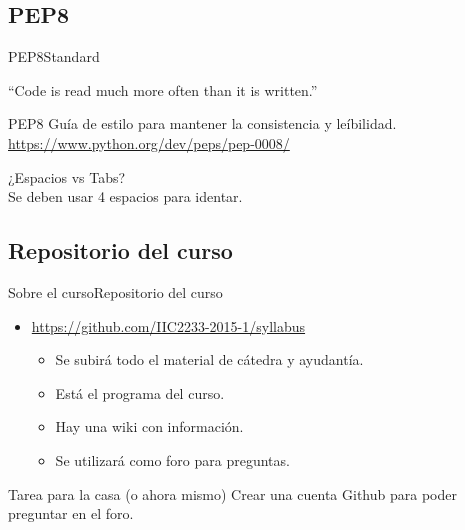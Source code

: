 \documentclass[spanish]{beamer}
\begin{document}
\subsection{PEP8}
\begin{frame}{PEP8}{Standard}

    \begin{exampleblock}{}
      {\large ``Code is read much more often than it is written.''}
      \vskip5mm
      \hspace*{}
    \end{exampleblock}
    
    \pause
    \begin{block}{PEP8}
        Guía de estilo para mantener la consistencia y leíbilidad. \\
        \url{https://www.python.org/dev/peps/pep-0008/}
    \end{block}
    
    \begin{example}
    ¿Espacios vs Tabs? \\
    Se deben usar 4 espacios para identar.
    \end{example}
\end{frame}

\subsection{Repositorio del curso}
\begin{frame}{Sobre el curso}{Repositorio del curso}
    \begin{itemize}
        \item \url{https://github.com/IIC2233-2015-1/syllabus}
        \pause
        \begin{itemize}
            \pause
            \item Se subirá todo el \alert{material} de cátedra y ayudantía.
            \pause
            \item Está el \alert{programa} del curso.
            \pause
            \item Hay una \alert{wiki} con información.
            \pause
            \item Se utilizará como \alert{foro} para preguntas.
        \end{itemize}
    \end{itemize}
    
    \pause
    \begin{block}{Tarea para la casa (o ahora mismo)}
      Crear una cuenta \alert{Github} para poder preguntar en el foro.
  \end{block}
\end{frame}
\end{document}
